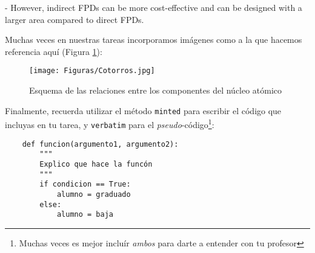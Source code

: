 \documentclass{assignment}
\begin{document}
\begin{problem}
{- However, indirect FPDs can be more cost-effective and can be designed with a larger area compared to direct FPDs.
}
\newpage




\noindent Muchas veces en nuestras tareas incorporamos imágenes como a la que hacemos referencia aquí (Figura \ref{fig:yo_en_la_vida}):
\begin{figure}[ht] %
    \centering
    \texttt{[image: Figuras/Cotorros.jpg]} %
    \caption{Esquema de las relaciones entre los componentes del núcleo atómico}
    \label{fig:yo_en_la_vida}
\end{figure}

\noindent Finalmente, recuerda utilizar el método \texttt{minted} para escribir el código que incluyas en tu tarea, y \texttt{verbatim} para el \textit{pseudo}-código\footnote{Muchas veces es mejor incluír \textit{ambos} para darte a entender con tu profesor}:

\begin{verbatim}
    def funcion(argumento1, argumento2):
        """
        Explico que hace la funcón
        """
        if condicion == True:
            alumno = graduado
        else:
            alumno = baja
\end{verbatim}

\end{problem}


    




\newpage

\nocite{*} %

\end{document}
